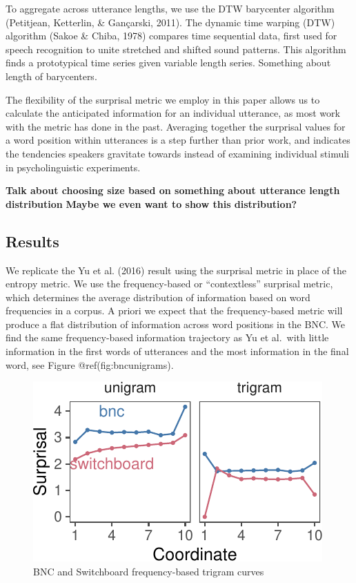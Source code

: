 \documentclass[10pt, letterpaper]{article}
\newenvironment{CodeChunk}{}{}
\begin{document}
To aggregate across utterance lengths, we use the DTW barycenter
algorithm (Petitjean, Ketterlin, \& Gançarski, 2011). The dynamic time
warping (DTW) algorithm (Sakoe \& Chiba, 1978) compares time sequential
data, first used for speech recognition to unite stretched and shifted
sound patterns. This algorithm finds a prototypical time series given
variable length series. Something about length of barycenters.

The flexibility of the surprisal metric we employ in this paper allows
us to calculate the anticipated information for an individual utterance,
as most work with the metric has done in the past. Averaging together
the surprisal values for a word position within utterances is a step
further than prior work, and indicates the tendencies speakers gravitate
towards instead of examining individual stimuli in psycholinguistic
experiments.

\textbf{Talk about choosing size based on something about utterance
length distribution} \textbf{Maybe we even want to show this
distribution?}

\hypertarget{results}{%
\subsection{Results}\label{results}}

We replicate the Yu et al. (2016) result using the surprisal metric in
place of the entropy metric. We use the frequency-based or
``contextless'' surprisal metric, which determines the average
distribution of information based on word frequencies in a corpus. A
priori we expect that the frequency-based metric will produce a flat
distribution of information across word positions in the BNC. We find
the same frequency-based information trajectory as Yu et al.~with little
information in the first words of utterances and the most information in
the final word, see Figure @ref(fig:bncunigrams).

\begin{CodeChunk}
\begin{figure}[tb]
\includegraphics{figs/bncunigrams-1} \caption[BNC and Switchboard frequency-based trigram curves]{BNC and Switchboard frequency-based trigram curves}\label{fig:bncunigrams}
\end{figure}
\end{CodeChunk}
\end{document}
